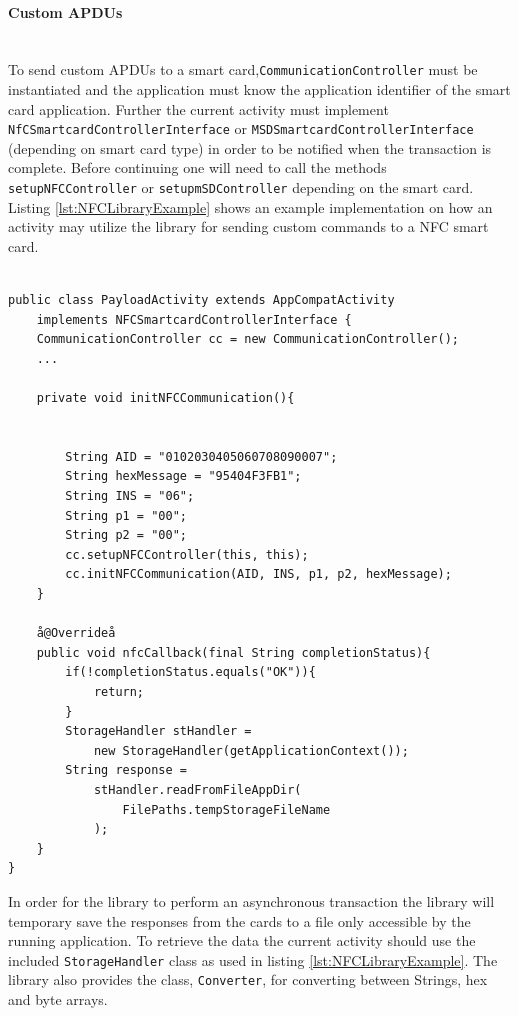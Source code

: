 \paragraph{Custom APDUs}\mbox{}\\
To send custom APDUs to a smart card,\texttt{CommunicationController} must be instantiated and the application must know the application identifier of the smart card application. Further the current activity must implement\\ \texttt{NfCSmartcardControllerInterface} or \texttt{MSDSmartcardControllerInterface} (depending on smart card type) in order to be notified when the transaction is complete. Before continuing one will need to call the methods \texttt{setupNFCController} or \texttt{setupmSDController} depending on the smart card. Listing \ref{lst:NFCLibraryExample} shows an example implementation on how an activity may utilize the library for sending custom commands to a NFC smart card.

\begin{lstlisting}[caption=Java code example showing how to send and receive commands to a NFC smart card., label=lst:NFCLibraryExample,escapechar=å]

public class PayloadActivity extends AppCompatActivity
    implements NFCSmartcardControllerInterface {
    CommunicationController cc = new CommunicationController();
    ...

    private void initNFCCommunication(){


        String AID = "0102030405060708090007";
        String hexMessage = "95404F3FB1";
        String INS = "06";
        String p1 = "00";
        String p2 = "00";
        cc.setupNFCController(this, this);
        cc.initNFCCommunication(AID, INS, p1, p2, hexMessage);
    }

    å@Overrideå
    public void nfcCallback(final String completionStatus){
        if(!completionStatus.equals("OK")){
            return;
        }
        StorageHandler stHandler =
            new StorageHandler(getApplicationContext());
        String response =
            stHandler.readFromFileAppDir(
                FilePaths.tempStorageFileName
            );
    }
}

\end{lstlisting}

In order for the library to perform an asynchronous transaction the library will temporary save the responses from the cards to a file only accessible by the running application. To retrieve the data the current activity should use the included \texttt{StorageHandler} class as used in listing \ref{lst:NFCLibraryExample}. The library also provides the class, \texttt{Converter}, for converting between Strings, hex and byte arrays.

